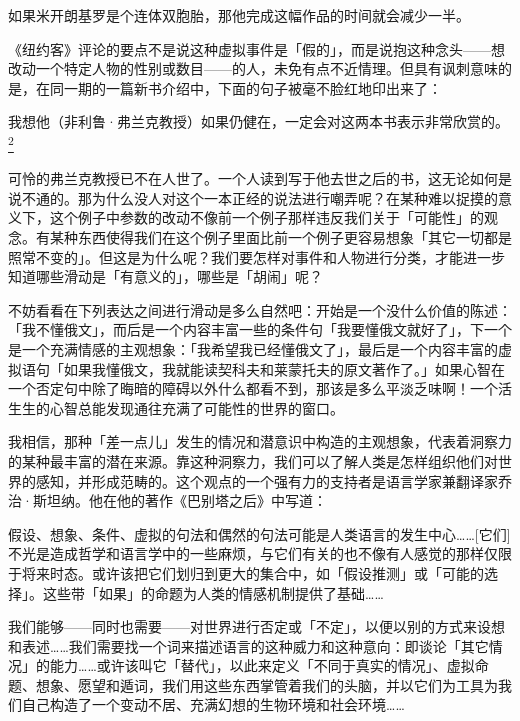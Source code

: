 \documentclass[
  12pt,
  twoside,
  openright,
  oldfontcommands,
]{memoir}
\newenvironment{fsquote}{%
  \begin{mdframed}[style=gebquote]\kaitifamily\small%
}{%
  \end{mdframed}%
}
\begin{document}
\begin{fsquote}
如果米开朗基罗是个连体双胞胎，那他完成这幅作品的时间就会减少一半。
\end{fsquote}

《纽约客》评论的要点不是说这种虚拟事件是「假的」，而是说抱这种念头------想改动一个特定人物的性别或数目------的人，未免有点不近情理。但具有讽刺意味的是，在同一期的一篇新书介绍中，下面的句子被毫不脸红地印出来了：

\begin{fsquote}
我想他（非利鲁·弗兰克教授）如果仍健在，一定会对这两本书表示非常欣赏的。\hyperref[fn:Chapter19-2]{\textsuperscript{2}}
\end{fsquote}

可怜的弗兰克教授已不在人世了。一个人读到写于他去世之后的书，这无论如何是说不通的。那为什么没人对这个一本正经的说法进行嘲弄呢？在某种难以捉摸的意义下，这个例子中参数的改动不像前一个例子那样违反我们关于「可能性」的观念。有某种东西使得我们在这个例子里面比前一个例子更容易想象「其它一切都是照常不变的」。但这是为什么呢？我们要怎样对事件和人物进行分类，才能进一步知道哪些滑动是「有意义的」，哪些是「胡闹」呢？

不妨看看在下列表达之间进行滑动是多么自然吧：开始是一个没什么价值的陈述：「我不懂俄文」，而后是一个内容丰富一些的条件句「我要懂俄文就好了」，下一个是一个充满情感的主观想象：「我希望我已经懂俄文了」，最后是一个内容丰富的虚拟语句「如果我懂俄文，我就能读契科夫和莱蒙托夫的原文著作了。」如果心智在一个否定句中除了晦暗的障碍以外什么都看不到，那该是多么平淡乏味啊！一个活生生的心智总能发现通往充满了可能性的世界的窗口。

我相信，那种「差一点儿」发生的情况和潜意识中构造的主观想象，代表着洞察力的某种最丰富的潜在来源。靠这种洞察力，我们可以了解人类是怎样组织他们对世界的感知，并形成范畴的。这个观点的一个强有力的支持者是语言学家兼翻译家乔治·斯坦纳。他在他的著作《巴别塔之后》中写道：

\begin{fsquote}
假设、想象、条件、虚拟的句法和偶然的句法可能是人类语言的发生中心\ldots\ldots{}{[}它们{]}不光是造成哲学和语言学中的一些麻烦，与它们有关的也不像有人感觉的那样仅限于将来时态。或许该把它们划归到更大的集合中，如「假设推测」或「可能的选择」。这些带「如果」的命题为人类的情感机制提供了基础\ldots\ldots{}
\end{fsquote}

我们能够------同时也需要------对世界进行否定或「不定」，以便以别的方式来设想和表述\ldots\ldots 我们需要找一个词来描述语言的这种威力和这种意向：即谈论「其它情况」的能力\ldots\ldots 或许该叫它「替代」，以此来定义「不同于真实的情况」、虚拟命题、想象、愿望和遁词，我们用这些东西掌管着我们的头脑，并以它们为工具为我们自己构造了一个变动不居、充满幻想的生物环境和社会环境\ldots\ldots{}
\end{document}
